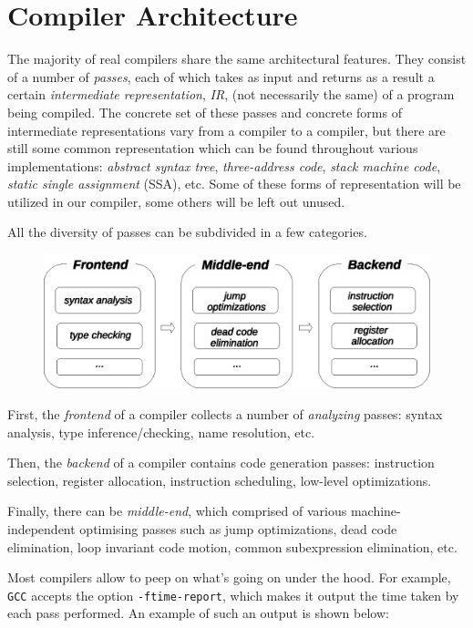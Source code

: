 \section{Compiler Architecture}

The majority of real compilers share the same architectural features. They consist of a number of \emph{passes}, each of which
takes as input and returns as a result a certain \emph{intermediate representation}, \emph{IR}, (not necessarily the same) of a program
being compiled. The concrete set of these passes and concrete forms of intermediate representations vary from a compiler to a compiler,
but there are still some common representation which can be found throughout various implementations: \emph{abstract syntax tree},
\emph{three-address code}, \emph{stack machine code}, \emph{static single assignment} (SSA), etc. Some of these forms of representation
will be utilized in our compiler, some others will be left out unused.

All the diversity of passes can be subdivided in a few categories.

\begin{figure}[h]
  \centering
  \includegraphics[scale=0.7]{images/01-06.eps}
\end{figure}

First, the \emph{frontend} of a compiler collects a number of \emph{analyzing} passes: syntax analysis, type inference/checking,
name resolution, etc.

Then, the \emph{backend} of a compiler contains code generation passes: instruction selection, register allocation,
instruction scheduling, low-level optimizations.

Finally, there can be \emph{middle-end}, which comprised of various machine-independent optimising passes such as
jump optimizations, dead code elimination, loop invariant code motion, common subexpression elimination, etc.

Most compilers allow to peep on what's going on under the hood. For example, \texttt{GCC} accepts the
option \texttt{-ftime-report}, which makes it output the time taken by each pass performed. An example
of such an output is shown below:

